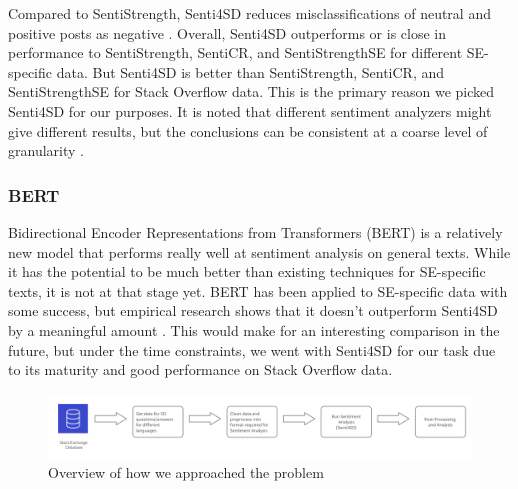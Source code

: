 \documentclass[conference]{IEEEtran}
\begin{document}
Compared to SentiStrength, Senti4SD reduces misclassifications of neutral and positive posts as negative \cite{b21}. Overall, Senti4SD outperforms or is close in performance to SentiStrength, SentiCR, and SentiStrengthSE for different SE-specific data\cite{b21, b26}. But Senti4SD is better than SentiStrength, SentiCR, and SentiStrengthSE for Stack Overflow data. This is the primary reason we picked Senti4SD for our purposes. It is noted that different sentiment analyzers might give different results, but the conclusions can be consistent at a coarse level of granularity \cite{b26}.\\

\subsubsection{BERT}
Bidirectional Encoder Representations from Transformers (BERT) is a relatively new model that performs really well at sentiment analysis on general texts\cite{b27}. While it has the potential to be much better than existing techniques for SE-specific texts, it is not at that stage yet. BERT has been applied to SE-specific data with some success\cite{b22}, but empirical research shows that it doesn't outperform Senti4SD by a meaningful amount \cite{b26}. This would make for an interesting comparison in the future, but under the time constraints, we went with Senti4SD for our task due to its maturity and good performance on Stack Overflow data. \\

\begin{figure}[tbp]
\centering
\includegraphics[width=\textwidth]{figures/4710_method_summary.png}
\caption{Overview of how we approached the problem}
\label{fig}
\end{figure}
\end{document}

